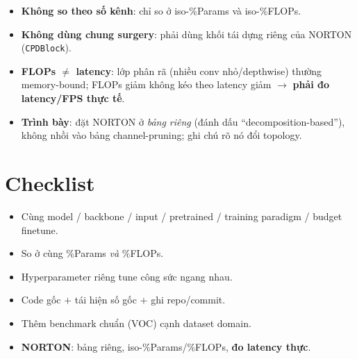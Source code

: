 \documentclass[11pt,a4paper]{article}
\begin{document}
\begin{itemize}
  \item \textbf{Không so theo số kênh}: chỉ so ở iso-\%Params và iso-\%FLOPs.
  \item \textbf{Không dùng chung surgery}: phải dùng khối tái dựng riêng của NORTON (\texttt{CPDBlock}).
  \item \textbf{FLOPs $\neq$ latency}: lớp phân rã (nhiều conv nhỏ/depthwise) thường memory-bound;
        FLOPs giảm không kéo theo latency giảm $\rightarrow$ \textbf{phải đo latency/FPS thực tế}.
  \item \textbf{Trình bày}: đặt NORTON ở \emph{bảng riêng} (đánh dấu ``decomposition-based''),
        không nhồi vào bảng channel-pruning; ghi chú rõ nó đổi topology.
\end{itemize}

\section*{Checklist}
\begin{itemize}
  \item[$\square$] Cùng model / backbone / input / pretrained / training paradigm / budget finetune.
  \item[$\square$] So ở cùng \%Params \emph{và} \%FLOPs.
  \item[$\square$] Hyperparameter riêng tune công sức ngang nhau.
  \item[$\square$] Code gốc $+$ tái hiện số gốc $+$ ghi repo/commit.
  \item[$\square$] Thêm benchmark chuẩn (VOC) cạnh dataset domain.
  \item[$\square$] \textbf{NORTON}: bảng riêng, iso-\%Params/\%FLOPs, \textbf{đo latency thực}.
\end{itemize}
\end{document}
